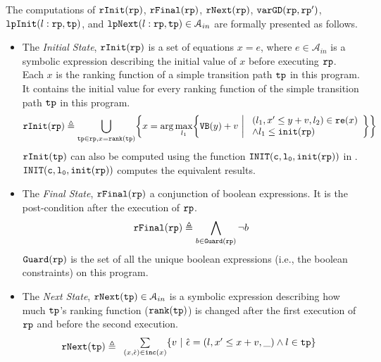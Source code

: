 \begin{defn}
    \label{def:alg-absstate}
   The computations of 
   $\mathtt{rInit}(\mathtt{rp})$, $\mathtt{rFinal}(\mathtt{rp})$, $\mathtt{rNext}(\mathtt{rp})$, $\mathtt{varGD}(\mathtt{rp}, \mathtt{rp}')$, 
   $\mathtt{lpInit}(l: \mathtt{rp}, \mathtt{tp})$, and $\mathtt{lpNext}(l: \mathtt{rp}, \mathtt{tp}) \in \mathcal{A}_{in}$
   are formally presented as follows.
   \begin{itemize}
    \item The \emph{Initial State}, 
    $\mathtt{rInit}(\mathtt{rp})$ is a set of equations $x = e$, where $e \in \mathcal{A}_{in}$ is a
    symbolic expression describing the initial value of $x$ before executing $\mathtt{rp}$.
    Each $x$ is the ranking function of a simple transition path $\mathtt{tp}$ in this program. 
    It contains the initial value for every ranking function of the simple transition path $\mathtt{tp}$ in this program.
   \[
     \rfinit(\rprog) \triangleq 
     \bigcup_{\tpath \in \rprog, x = \locbound(\tpath)}
     \left \{ 
     x = \arg\max_{l_1}\left\{
       \varinvar(y) + v ~\middle\vert~ 
       \begin{array}{l} 
         (l_1, x' \leq y + v, l_2) \in \reset(x) 
         \\
       \land l_1 \leq \absinit(\rprog)
     \end{array}
     \right\}
     \right\}
     \]
   $\mathtt{rInit}(\mathtt{tp})$ can also be computed using the function $\mathtt{INIT(c, l_0, \mathtt{init}(\mathtt{rp}))}$ in \cite{GulwaniJK09}. 
   $\mathtt{INIT(c, l_0, \mathtt{init}(\mathtt{rp}))}$ computes the equivalent results.
   \item  The \emph{Final State}, $\mathtt{rFinal}(\mathtt{rp})$ a conjunction of boolean expressions.
   It is the post-condition
   after the execution of $\mathtt{rp}$.
   \[
     \mathtt{rFinal}(\mathtt{rp}) \triangleq 
     \bigwedge_{b \in \mathtt{Guard}(\mathtt{rp})}
     \neg b
     \]
    $\mathtt{Guard}(\mathtt{rp})$ is the set of all the unique boolean expressions (i.e., the boolean constraints) on this program.
   \item The \emph{Next State}, $\mathtt{rNext}(\mathtt{tp}) \in \mathcal{A}_{in}$ 
   is a
   symbolic expression describing how much $\mathtt{tp}$'s ranking function ($\mathtt{rank}(\mathtt{tp})$) is changed after the first execution of $\mathtt{rp}$ and before the second execution.
   \[
     \begin{array}{l}
     \rfnext(\tpath) \triangleq 
       \begin{array}{l}
    \sum\limits_{(x, \absevent) \in \inc(x) }
     \left\{ v ~\middle\vert~ \absevent = (l, x' \leq x + v, \_) \land l \in \tpath\right\}

\end{array}
\end{array}\]
\end{itemize}
\end{defn}
